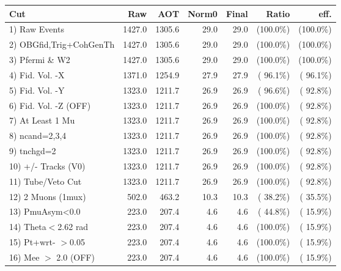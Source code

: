  \begin{table}[h!]\centering
 \begin{tabular}{||l||r|r|r|r|r|r||}
 \hline
 \hline
 Cut & Raw & AOT & Norm0 & Final & Ratio & eff.       \\
 \hline
  1) Raw Events           &       1427.0 &       1305.6 &         29.0 &         29.0 & (100.0\%) & (100.0\%) \\
  2) OBGfid,Trig+CohGenTh &       1427.0 &       1305.6 &         29.0 &         29.0 & (100.0\%) & (100.0\%) \\
  3) Pfermi \& W2         &       1427.0 &       1305.6 &         29.0 &         29.0 & (100.0\%) & (100.0\%) \\
  4) Fid. Vol. -X         &       1371.0 &       1254.9 &         27.9 &         27.9 & ( 96.1\%) & ( 96.1\%) \\
  5) Fid. Vol. -Y         &       1323.0 &       1211.7 &         26.9 &         26.9 & ( 96.6\%) & ( 92.8\%) \\
  6) Fid. Vol. -Z (OFF)   &       1323.0 &       1211.7 &         26.9 &         26.9 & (100.0\%) & ( 92.8\%) \\
  7) At Least 1 Mu        &       1323.0 &       1211.7 &         26.9 &         26.9 & (100.0\%) & ( 92.8\%) \\
  8) ncand=2,3,4          &       1323.0 &       1211.7 &         26.9 &         26.9 & (100.0\%) & ( 92.8\%) \\
  9) tnchgd=2             &       1323.0 &       1211.7 &         26.9 &         26.9 & (100.0\%) & ( 92.8\%) \\
 10) +/- Tracks (V0)      &       1323.0 &       1211.7 &         26.9 &         26.9 & (100.0\%) & ( 92.8\%) \\
 11) Tube/Veto Cut        &       1323.0 &       1211.7 &         26.9 &         26.9 & (100.0\%) & ( 92.8\%) \\
 12) 2 Muons (1mux)       &        502.0 &        463.2 &         10.3 &         10.3 & ( 38.2\%) & ( 35.5\%) \\
 13) PmuAsym<0.0          &        223.0 &        207.4 &          4.6 &          4.6 & ( 44.8\%) & ( 15.9\%) \\
 14) Theta$<$2.62 rad     &        223.0 &        207.4 &          4.6 &          4.6 & (100.0\%) & ( 15.9\%) \\
 15) Pt+wrt- $>$0.05      &        223.0 &        207.4 &          4.6 &          4.6 & (100.0\%) & ( 15.9\%) \\
 16) Mee $>$ 2.0  (OFF)   &        223.0 &        207.4 &          4.6 &          4.6 & (100.0\%) & ( 15.9\%) \\

\end{tabular}
\end{table}
